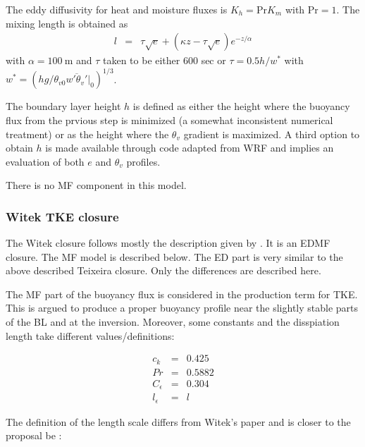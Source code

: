 \documentclass[dvipdfmx,a4paper,10pt]{article}
\begin{document}
The eddy diffusivity for heat and moisture fluxes is $K_h=\mathrm{Pr} K_m$ with $\mathrm{Pr}=1$. The mixing length is obtained as
\begin{eqnarray}
 l &=& \tau \sqrt{e} + (\kappa z - \tau \sqrt{e}) e^{-z/\alpha}
\end{eqnarray}
with $\alpha=100\mathrm{~m}$ and $\tau$ taken to be either 600 sec or $\tau=0.5 h/w^*$ with $w^*=(hg/\theta_{v0} \overline{w'\theta_v'}|_0)^{1/3}$. 

The boundary layer height $h$ is defined as either the height where the buoyancy flux from the prvious step is minimized (a somewhat inconsistent numerical treatment) or as the height where the $\theta_v$ gradient is maximized. A third option to obtain $h$ is made available through code adapted from WRF and implies an evaluation of both $e$ and $\theta_v$ profiles. 

There is no MF component in this model.

\subsubsection{Witek TKE closure}

The Witek closure follows mostly the description given by \cite{witek11}. It is an EDMF closure. The MF model is described below. The ED part is very similar to the above described Teixeira closure. Only the differences are described here.

The MF part of the buoyancy flux is considered in the production term for TKE. This is argued to produce a proper buoyancy profile near the slightly stable parts of the BL and at the inversion. 
Moreover, some constants and the disspiation length take different values/definitions:

\begin{eqnarray}
 c_k&=&0.425\\
 Pr&=&0.5882\\
 C_{\epsilon}&=&0.304\\
 l_{\epsilon}&=&l
\end{eqnarray}

The definition of the length scale differs from Witek's paper and is closer to the proposal be \cite{suselj13}:
\end{document}
